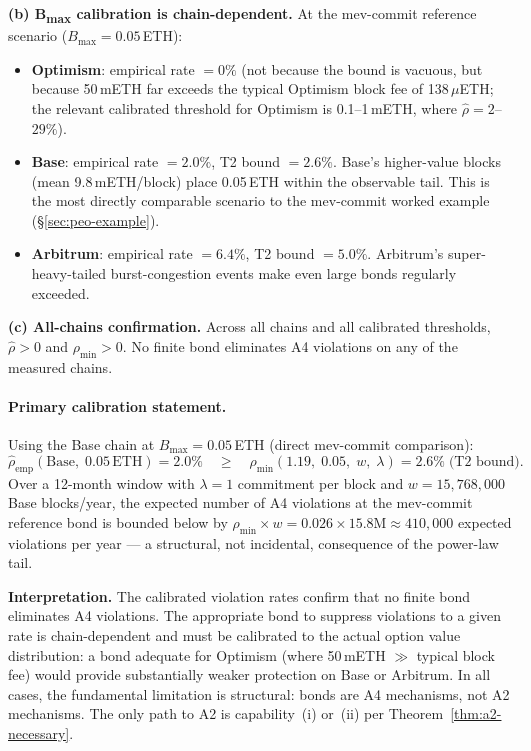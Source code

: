 \textbf{(b) B\textsubscript{max} calibration is chain-dependent.}
At the mev-commit reference scenario ($B_{\max} = 0.05$\,ETH):
\begin{itemize}
  \item \textbf{Optimism}: empirical rate $= 0\%$ (not because the bound is
    vacuous, but because 50\,mETH far exceeds the typical Optimism block fee
    of 138\,$\mu$ETH; the relevant calibrated threshold for Optimism is
    0.1--1\,mETH, where $\hat{\rho} = 2$--$29\%$).
  \item \textbf{Base}: empirical rate $= 2.0\%$, T2 bound $= 2.6\%$.
    Base's higher-value blocks (mean 9.8\,mETH/block) place 0.05\,ETH within
    the observable tail. This is the most directly comparable scenario to
    the mev-commit worked example (\S\ref{sec:peo-example}).
  \item \textbf{Arbitrum}: empirical rate $= 6.4\%$, T2 bound $= 5.0\%$.
    Arbitrum's super-heavy-tailed burst-congestion events make even large
    bonds regularly exceeded.
\end{itemize}

\textbf{(c) All-chains confirmation.}
Across all chains and all calibrated thresholds, $\hat{\rho} > 0$ and
$\rho_{\min} > 0$. No finite bond eliminates A4 violations on any of the
measured chains.

\paragraph{Primary calibration statement.}
Using the Base chain at $B_{\max} = 0.05$\,ETH (direct mev-commit comparison):
\[
  \hat{\rho}_{\text{emp}}(\text{Base},\; 0.05\,\text{ETH}) = 2.0\%
  \quad \geq \quad
  \rho_{\min}(1.19,\; 0.05,\; w,\; \lambda) = 2.6\%
  \;\text{(T2 bound).}
\]
Over a 12-month window with $\lambda = 1$ commitment per block and
$w = 15{,}768{,}000$ Base blocks/year, the expected number of A4
violations at the mev-commit reference bond is bounded below by
$\rho_{\min} \times w = 0.026 \times 15.8\text{M} \approx 410{,}000$
expected violations per year --- a structural, not incidental, consequence
of the power-law tail.

\noindent\textbf{Interpretation.}
The calibrated violation rates confirm that no finite bond eliminates A4
violations. The appropriate bond to suppress violations to a given rate is
chain-dependent and must be calibrated to the actual option value distribution:
a bond adequate for Optimism (where 50\,mETH $\gg$ typical block fee) would
provide substantially weaker protection on Base or Arbitrum. In all cases,
the fundamental limitation is structural: bonds are A4 mechanisms, not A2
mechanisms. The only path to A2 is capability~(i) or~(ii) per
Theorem~\ref{thm:a2-necessary}.
